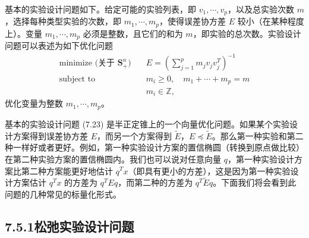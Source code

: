 \documentclass[UTF8, 12pt, fontset=fandol, oneside]{ctexart}
\begin{document}
基本的实验设计问题如下。给定可能的实验列表，即 $v_1,\cdots,v_p$，以及总实验次数 $m$，选择每种类型实验的次数，即 $m_1,\cdots,m_p$，使得误差协方差 $E$ 较小（在某种程度上）。变量 $m_1,\cdots,m_p$ 必须是整数，且它们的和为 $m$，即实验的总次数。实验设计问题可以表述为如下优化问题
\begin{equation}
\begin{aligned}
\text{minimize (关于 $\mathbf{S}_+^n$)}\quad & E=\left(\sum_{j=1}^p m_jv_jv_j^T\right)^{-1}\\
\text{subject to}\quad & m_i\geq 0,\quad m_1+\cdots+m_p=m\\
& m_i\in\mathbb{Z},
\end{aligned}
\tag{7.23}
\end{equation}
优化变量为整数 $m_1,\cdots,m_p$。

基本的实验设计问题 (7.23) 是半正定锥上的一个向量优化问题。如果某个实验设计方案得到误差协方差 $E$，而另一个方案得到 $\tilde{E}$，$E\preceq \tilde{E}$。那么第一种实验和第二种一样好或者更好。例如，第一种实验设计方案的置信椭圆（转换到原点做比较）在第二种实验方案的置信椭圆内。我们也可以说对任意向量 $q$，第一种实验设计方案比第二种方案能更好地估计 $q^Tx$（即具有更小的方差），这是因为第一种实验设计方案估计 $q^Tx$ 的方差为 $q^TEq$，而第二种的方差为 $q^T\tilde{E}q$。下面我们将会看到此问题的几种常见的标量化形式。

\subsection*{7.5.1\quad 松弛实验设计问题}
\end{document}
